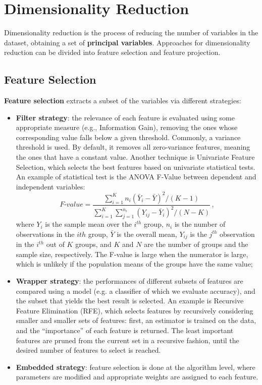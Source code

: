 \chapter{Dimensionality Reduction}

Dimensionality reduction is the process of reducing the number of variables in the dataset, obtaining a set of \textbf{principal variables}. Approaches for dimensionality reduction can be divided into feature selection and feature projection.

\section{Feature Selection}

\textbf{Feature selection} extracts a subset of the variables via different strategies: \begin{itemize}
    \item \textbf{Filter strategy}: the relevance of each feature is evaluated using some appropriate measure (e.g., Information Gain), removing the ones whose corresponding value falls below a given threshold. Commonly, a variance threshold is used. By default, it removes all zero-variance features, meaning the ones that have a constant value. Another technique is Univariate Feature Selection, which selects the best features based on univariate statistical tests. An example of statistical test is the ANOVA F-Value between dependent and independent variables:
    \begin{equation*}
        \textit{F-value} = \dfrac{\sum_{i=1}^K n_i(\bar{Y}_i - \bar{Y})^2 / (K-1)}{\sum_{i=1}^K \sum_{j=1}^{n_i} (Y_{ij} - \bar{Y}_i)^2 / (N-K)} \,,
    \end{equation*}
    where $Y_i$ is the sample mean over the $i^{th}$ group, $n_i$ is the number of observations in the $i{th}$ group, $\bar{Y}$ is the overall mean, $Y_{ij}$ is the $j^{th}$ observation in the $i^{th}$ out of $K$ groups, and $K$ and $N$ are the number of groups and the sample size, respectively. The F-value is large when the numerator is large, which is unlikely if the population means of the groups have the same value;

    \item \textbf{Wrapper strategy}: the performances of different subsets of features are compared using a model (e.g. a classifier of which we evaluate accuracy), and the subset that yields the best result is selected. An example is Recursive Feature Elimination (RFE), which selects features by recursively considering smaller and smaller sets of features: first, an estimator is trained on the data, and the ``importance'' of each feature is returned. The least important features are pruned from the current set in a recursive fashion, until the desired number of features to select is reached.

    \item \textbf{Embedded strategy}: feature selection is done at the algorithm level, where parameters are modified and appropriate weights are assigned to each feature.
\end{itemize}

